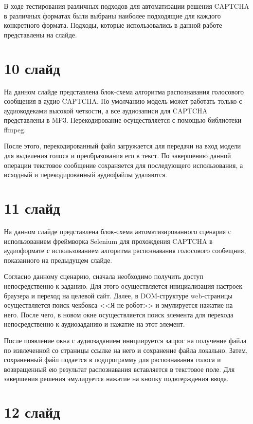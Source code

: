 \documentclass{altsu-report}
\begin{document}
В ходе тестирования различных подходов для автоматизации решения CAPTCHA в 
различных форматах были выбраны наиболее подходящие для каждого конкретного 
формата. Подходы, которые использовались в данной работе представлены на слайде.

\section*{10 слайд}

На данном слайде представлена блок-схема алгоритма распознавания голосового 
сообщения в аудио CAPTCHA. По умолчанию модель может работать только с 
аудиокодеками высокой четкости, а все аудиозаписи для CAPTCHA представлены в MP3. 
Перекодирование осуществляется с помощью библиотеки ffmpeg.

После этого, перекодированный файл загружается для передачи на вход модели для 
выделения голоса и преобразования его в текст. По завершению данной операции 
текстовое сообщение сохраняется для последующего использования, а исходный и 
перекодированный аудиофайлы удаляются.

\section*{11 слайд}

На данном слайде представлена блок-схема автоматизированного сценария с 
использованием фреймворка Selenium для прохождения CAPTCHA в аудиоформате с 
использованием алгоритма распознавания голосового сообещния, показанного на 
предыдущем слайде.

Согласно данному сценарию, сначала необходимо получить доступ непосредственно к 
заданию. Для этого осуществляется инициализация настроек браузера и переход на 
целевой сайт. Далее, в DOM-структуре web-страницы осуществляется поиск чекбокса 
<<Я не робот>> и эмулируется нажатие на него. После чего, в новом окне 
осуществляется поиск элемента для перехода непосредственно к аудиозаданию и 
нажатие на этот элемент.

После появление окна с аудиозаданием инициируется запрос на получение файла по 
извлеченной со страницы ссылке на него и сохранение файла локально. Затем, 
сохраненный файл подается в подпрограмму для распознавания голоса и возвращенный 
ею результат распознавания вставляется в текстовое поле. Для завершения решения 
эмулируется нажатие на кнопку подвтерждения ввода.

\section*{12 слайд}
\end{document}
